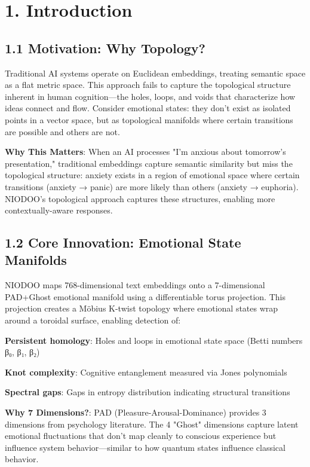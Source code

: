 \documentclass[11pt,a4paper]{article}
\begin{document}
\section{1. Introduction}

\subsection{1.1 Motivation: Why Topology?}

Traditional AI systems operate on Euclidean embeddings, treating semantic space as a flat metric space. This approach fails to capture the topological structure inherent in human cognition—the holes, loops, and voids that characterize how ideas connect and flow. Consider emotional states: they don't exist as isolated points in a vector space, but as topological manifolds where certain transitions are possible and others are not.

\textbf{Why This Matters}: When an AI processes "I'm anxious about tomorrow's presentation," traditional embeddings capture semantic similarity but miss the topological structure: anxiety exists in a region of emotional space where certain transitions (anxiety → panic) are more likely than others (anxiety → euphoria). NIODOO's topological approach captures these structures, enabling more contextually-aware responses.

\subsection{1.2 Core Innovation: Emotional State Manifolds}

NIODOO maps 768-dimensional text embeddings onto a 7-dimensional PAD+Ghost emotional manifold using a differentiable torus projection. This projection creates a Möbius K-twist topology where emotional states wrap around a toroidal surface, enabling detection of:
\item \textbf{Persistent homology}: Holes and loops in emotional state space (Betti numbers β₀, β₁, β₂)
\item \textbf{Knot complexity}: Cognitive entanglement measured via Jones polynomials
\item \textbf{Spectral gaps}: Gaps in entropy distribution indicating structural transitions

\textbf{Why 7 Dimensions?}: PAD (Pleasure-Arousal-Dominance) provides 3 dimensions from psychology literature. The 4 "Ghost" dimensions capture latent emotional fluctuations that don't map cleanly to conscious experience but influence system behavior—similar to how quantum states influence classical behavior.
\end{document}
